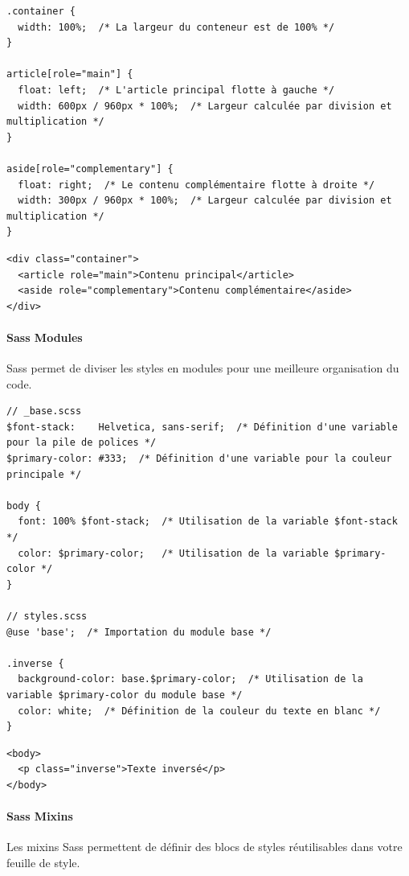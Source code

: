\documentclass{report}
\begin{document}
\begin{multicols*}{2}
\begin{lstlisting}[style=CSSDraculaLight]
.container { 
  width: 100%;  /* La largeur du conteneur est de 100% */
}

article[role="main"] {
  float: left;  /* L'article principal flotte à gauche */
  width: 600px / 960px * 100%;  /* Largeur calculée par division et multiplication */
}

aside[role="complementary"] {
  float: right;  /* Le contenu complémentaire flotte à droite */
  width: 300px / 960px * 100%;  /* Largeur calculée par division et multiplication */
}
\end{lstlisting}

\begin{lstlisting}[style=HTMLDraculaDark]
<div class="container">
  <article role="main">Contenu principal</article>
  <aside role="complementary">Contenu complémentaire</aside>
</div>
\end{lstlisting}

\paragraph{Sass Modules}
Sass permet de diviser les styles en modules pour une meilleure organisation du code.

\begin{lstlisting}[style=CSSDraculaLight]
// _base.scss
$font-stack:    Helvetica, sans-serif;  /* Définition d'une variable pour la pile de polices */
$primary-color: #333;  /* Définition d'une variable pour la couleur principale */

body {
  font: 100% $font-stack;  /* Utilisation de la variable $font-stack */
  color: $primary-color;   /* Utilisation de la variable $primary-color */
}

// styles.scss
@use 'base';  /* Importation du module base */

.inverse {
  background-color: base.$primary-color;  /* Utilisation de la variable $primary-color du module base */
  color: white;  /* Définition de la couleur du texte en blanc */
}
\end{lstlisting}

\begin{lstlisting}[style=HTMLDraculaDark]
<body>
  <p class="inverse">Texte inversé</p>
</body>
\end{lstlisting}

\paragraph{Sass Mixins}
Les mixins Sass permettent de définir des blocs de styles réutilisables dans votre feuille de style.


\end{multicols*}
\end{document}
